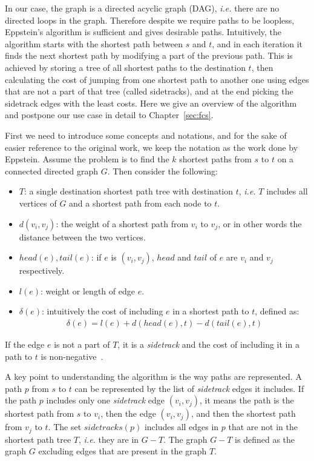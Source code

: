 In our case, the graph is a directed acyclic graph (DAG), \emph{i.e.} there are no directed loops in the graph. Therefore despite we require paths to be loopless, Eppstein's algorithm is sufficient and gives desirable paths.
Intuitively, the algorithm starts with the shortest path between $s$ and $t$, and in each iteration it finds the next shortest path by modifying a part of the previous path. This is achieved by storing a tree of all shortest paths to the destination $t$, then calculating the cost of jumping from one shortest path to another one using edges that are not a part of that tree (called sidetracks), and at the end picking the sidetrack edges with the least costs.
Here we give an overview of the algorithm and postpone our use case in detail to Chapter~\ref{sec:fcs}.

First we need to introduce some concepts and notations, and for the sake of easier reference to the original work, we keep the notation as the work done by Eppstein.
Assume the problem is to find the $k$ shortest paths from $s$ to $t$ on a connected directed graph $G$. Then consider the following:
\begin{itemize}
\item $T$: a single destination shortest path tree with destination $t$, \emph{i.e.} $T$ includes all vertices of $G$ and a shortest path from each node to $t$.
\item $d(v_i, v_j)$: the weight of a shortest path from $v_i$ to $v_j$, or in other words the distance between the two vertices.
\item $head(e), tail(e)$: if $e$ is $(v_i, v_j)$, $head$ and $tail$ of $e$ are $v_i$ and $v_j$ respectively.
\item $l(e)$: weight or length of edge $e$.
\item $\delta(e)$: intuitively the cost of including $e$ in a shortest path to $t$, defined as:
  \begin{align}
    \delta(e) = l(e) + d(head(e), t) - d(tail(e), t)
  \end{align}
\end{itemize}

If the edge $e$ is not a part of $T$, it is a \emph{sidetrack} and the cost of including it in a path to $t$ is non-negative~\cite[Lemma 1]{eppstein1998finding}.

A key point to understanding the algorithm is the way paths are represented. A path $p$ from $s$ to $t$ can be represented by the list of \emph{sidetrack} edges it includes. If the path $p$ includes only one \emph{sidetrack} edge $(v_i, v_j)$, it means the path is the shortest path from $s$ to $v_i$, then the edge $(v_i, v_j)$, and then the shortest path from $v_j$ to $t$. The set $sidetracks(p)$ includes all edges in $p$ that are not in the shortest path tree $T$, \emph{i.e.} they are in $G - T$. The graph $G - T$ is defined as the graph $G$ excluding edges that are present in the graph $T$.

